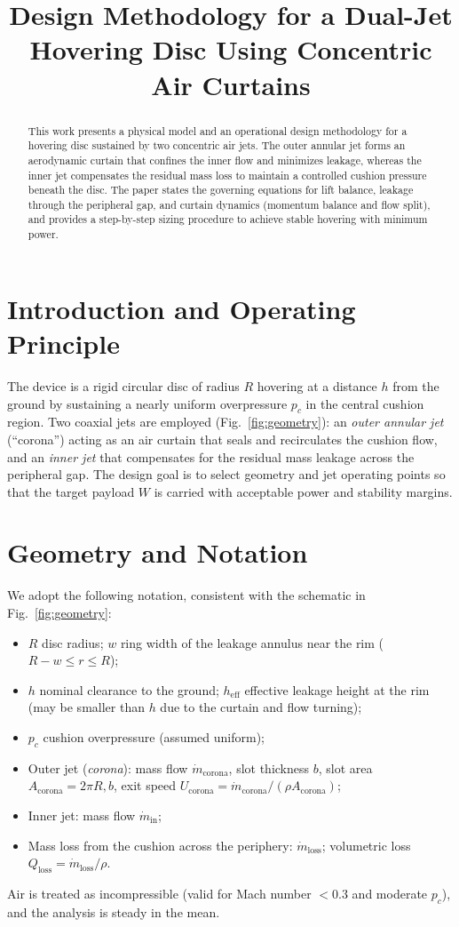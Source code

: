 \documentclass[11pt,a4paper]{article}
\title{Design Methodology for a Dual-Jet Hovering Disc Using Concentric Air Curtains}
\author{ }
\date{ }
\begin{document}
\maketitle

\begin{abstract}
This work presents a physical model and an operational design methodology for a hovering disc sustained by two concentric air jets. The outer annular jet forms an aerodynamic curtain that confines the inner flow and minimizes leakage, whereas the inner jet compensates the residual mass loss to maintain a controlled cushion pressure beneath the disc. The paper states the governing equations for lift balance, leakage through the peripheral gap, and curtain dynamics (momentum balance and flow split), and provides a step-by-step sizing procedure to achieve stable hovering with minimum power.
\end{abstract}

\section{Introduction and Operating Principle}
The device is a rigid circular disc of radius $R$ hovering at a distance $h$ from the ground by sustaining a nearly uniform overpressure $p_c$ in the central cushion region. Two coaxial jets are employed (Fig.~\ref{fig:geometry}): an \emph{outer annular jet} (``corona'') acting as an air curtain that seals and recirculates the cushion flow, and an \emph{inner jet} that compensates for the residual mass leakage across the peripheral gap. The design goal is to select geometry and jet operating points so that the target payload $W$ is carried with acceptable power and stability margins.

\section{Geometry and Notation}
We adopt the following notation, consistent with the schematic in Fig.~\ref{fig:geometry}:
\begin{itemize}
\item $R$ disc radius; $w$ ring width of the leakage annulus near the rim ($R-w\le r\le R$);
\item $h$ nominal clearance to the ground; $h_{\mathrm{eff}}$ effective leakage height at the rim (may be smaller than $h$ due to the curtain and flow turning);
\item $p_c$ cushion overpressure (assumed uniform);
\item Outer jet (\textit{corona}): mass flow $\dot m_{\mathrm{corona}}$, slot thickness $b$, slot area $A_{\mathrm{corona}}=2\pi R,b$, exit speed $U_{\mathrm{corona}}=\dot m_{\mathrm{corona}}/(\rho A_{\mathrm{corona}})$;
\item Inner jet: mass flow $\dot m_{\mathrm{in}}$;
\item Mass loss from the cushion across the periphery: $\dot m_{\mathrm{loss}}$; volumetric loss $Q_{\mathrm{loss}}=\dot m_{\mathrm{loss}}/\rho$.
\end{itemize}
Air is treated as incompressible (valid for Mach number $<0.3$ and moderate $p_c$), and the analysis is steady in the mean.
\end{document}
